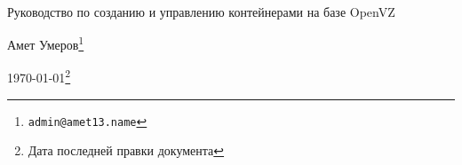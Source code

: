
{~}\bigskip %

\begin{center}
\Huge{Руководство по созданию и управлению контейнерами на базе OpenVZ} %

\vspace{1em}
\Large{Амет Умеров}\footnote{\texttt{admin@amet13.name}} %

\Large{\today}\footnote{Дата последней правки документа} %
\end{center}

\clearpage %
